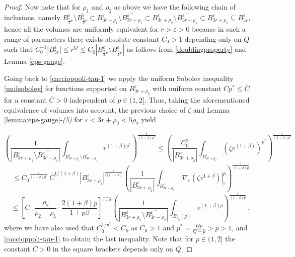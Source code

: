 \documentclass[10pt]{amsart}
\numberwithin{equation}{section}
\theoremstyle{definition}
\begin{document}
\begin{proof}
Now note that for $\rho_1$ and $\rho_2$ as above we have the following chain of inclusions, namely $ B^\varepsilon_{\frac72 r} \setminus \overline{B^\varepsilon_{\frac52 r}} \subset B^\varepsilon_{3r+\rho_1} \setminus \overline{B^\varepsilon_{3r-\rho_1}}\subset  B^\varepsilon_{3r+\rho_2} \setminus \overline{B^\varepsilon_{3r-\rho_2}} \subset B^\varepsilon_{3r+\rho_2} \subseteq  B^\varepsilon_{5r}$, hence 
all the volumes are uniformly equivalent for $r>\varepsilon>0$ because in such a range of parameters there exists absolute constant $C_0>1$ depending only on $Q$ such that $C_0^{-1}|B^\varepsilon_{5r}| \leq r^Q \leq C_0 | B^\varepsilon_{\frac72 r} \setminus \overline{B^\varepsilon_{\frac52 r}} |$ as follows from \eqref{doublingproperty} and Lemma \ref{eps-gauge}.


Going back to \eqref{caccioppoli-tau-1} we apply the uniform Sobolev inequality \eqref{unifsobolev} for functions supported on $B^\varepsilon_{3r+\rho_2}$ with uniform constant $C p^* \leq \overline{C}$ for a constant $\overline{C}>0$ independent of $p \in (1,2]$. Thus,  taking the aforementioned equivalence of volumes into account, the previous choice of $\zeta$ and Lemma \ref{lemma:eps-gauge}-{\it (5)} for $\varepsilon<3r+\rho_2 < 5 \rho_2$ yield

\begin{equation}
  \label{revholder-beta}	
  \left( \frac{1}{ |B^\varepsilon_{3r+\rho_1} \setminus \overline{B^\varepsilon_{3r-\rho_1}}|}\int_{  B^\varepsilon_{3r+\rho_1} \setminus \overline{B^\varepsilon_{3r-\rho_1}}}  v^{(1+\beta) p^*}   \right)^{\frac{1}{(1+\beta)p^*}}  
  \leq  \left( \frac{C_0^2}{ |B^\varepsilon_{3r+\rho_2} |}
  \int_{  B^\varepsilon_{3r+\rho_2} }  \left( \zeta v^{(1+\beta)}\right)^{p^*}   
  \right)^{\frac{1}{(1+\beta)p^*}}  
\end{equation}  
\[ \leq {C_0}^{\frac{2}{(1+\beta)p^*}} \, \overline{C}^{1/(1+\beta)}   |B^\varepsilon_{3r+\rho_2} | ^{\frac{1}{Q(1+\beta)}}
\left(   \frac{1}{ |B^\varepsilon_{3r+\rho_2} |} \int_{B^\varepsilon_{3r+\rho_2}}   | \nabla_\varepsilon \left( \zeta v^{1+\beta}\right) |_\varepsilon^p  \right)^{\frac{1}{(1+\beta)p}} \]
  \[\leq   \left[ C \cdot  
 \frac{\rho_2}{\rho_2-\rho_1}  \cdot  \frac{2(1+\beta)p}{1+p\beta}
  \right]^{\frac{1}{1+\beta}}  \left(  \frac{1}{ |B^\varepsilon_{3r+\rho_2} \setminus \overline{B^\varepsilon_{3r-\rho_2}}|}\int_{B^\varepsilon_{\rho_2}(\bar{g})}   v^{(1+\beta)p }  \right)^{\frac{1}{(1+\beta)p}}\, ,
\]
where we have also used that $C_0^{1/p^*}<C_0$ as $C_0>1$ and $p^*=\frac{Qp}{Q-p}>p>1$, and \eqref{caccioppoli-tau-1} to obtain the last inequality. Note that for $p \in (1,2]$ the constant $C>0$ in the square brackets depends only on $Q$.





\end{proof}
\end{document}
